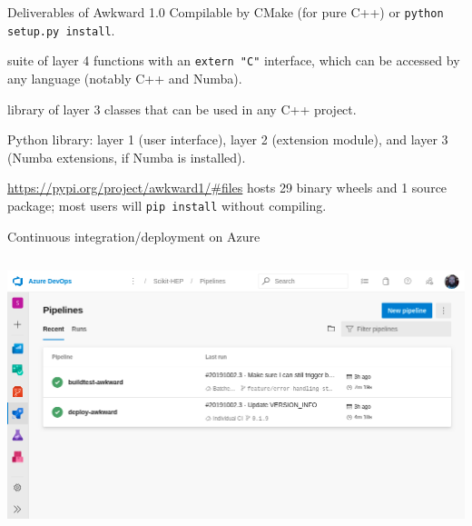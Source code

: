 \documentclass[aspectratio=169]{beamer}
\begin{document}
\begin{frame}{Deliverables of Awkward 1.0}
\large
\vspace{0.75 cm}
Compilable by CMake (for pure C++) or \texttt{python setup.py install}.

\vspace{0.5 cm}
\begin{description}\setlength{\itemsep}{0.5 cm}
\item[cpu-kernels.so] suite of layer 4 functions with an \texttt{extern "C"} interface, which can be accessed by any language (notably C++ and Numba).

\item[libawkward.so] library of layer 3 classes that can be used in any C++ project.

\item[\hspace{0.75 cm}awkward1] Python library: layer 1 (user interface), layer 2 (extension module), and layer 3 (Numba extensions, if Numba is installed).
\end{description}

\vspace{0.75 cm}
\textcolor{blue}{\normalsize \url{https://pypi.org/project/awkward1/\#files}} hosts 29 binary wheels and 1 source package; most users will \texttt{pip install} without compiling.
\end{frame}

\begin{frame}{Continuous integration/deployment on Azure}
\vspace{0.15 cm}
\begin{columns}
\includegraphics[width=\linewidth]{azure-screenshot.png}
\end{columns}
\end{frame}
\end{document}
